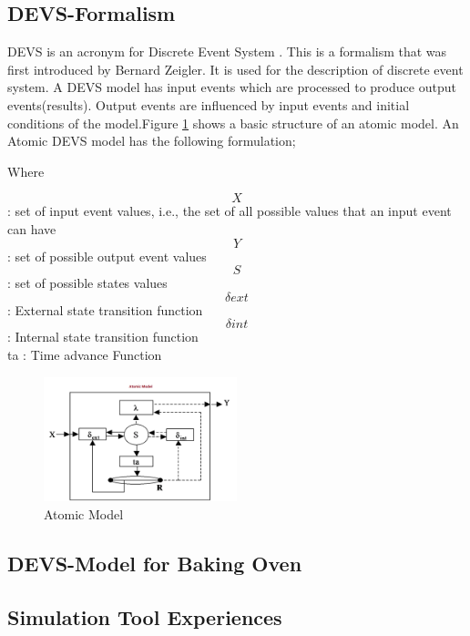 \documentclass[titlepage]{article}%
\begin{document}
{\subsection{DEVS-Formalism}

DEVS is an acronym for Discrete Event System . This is a formalism that was first introduced by Bernard Zeigler. It is used for the description of discrete event system.  A DEVS model has input events which are processed to produce output events(results). Output events are influenced by  input events and  initial conditions of the model.Figure \ref{atomic_model} shows a basic structure of an atomic model.  An Atomic DEVS model has the following formulation;

Where

$$X$$ 		: set of input event values, i.e., the set of all possible values that an input event can have \\
$$Y$$ 		: set of possible output event values \\
$$S$$ 		: set of possible states values \\
$$\delta ext$$ 	: External state transition function \\
$$\delta int$$ 	: Internal state transition function \\
ta	  	: Time advance  Function \\

\begin{figure}[ht!]
  \centering
    \includegraphics[width=0.5\textwidth]{Fig1.png}
    \caption{Atomic Model}
    \label{atomic_model}
\end{figure}


\subsection{DEVS-Model for Baking Oven}
\subsection{Simulation Tool Experiences}


}
\end{document}
